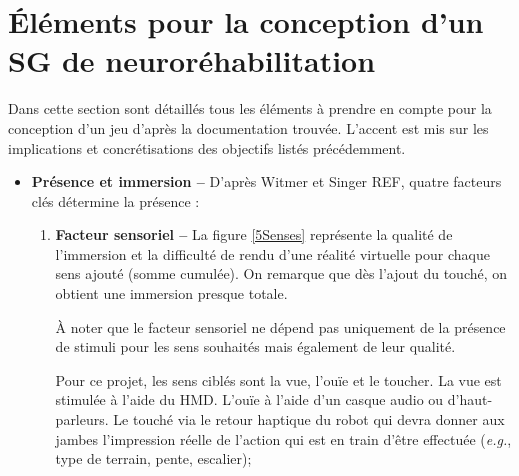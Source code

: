 \section{Éléments pour la conception d'un SG de neuroréhabilitation}
	\label{sAnaGameConceptPointsImportant}
	Dans cette section sont détaillés tous les éléments à prendre en compte pour la conception d'un jeu d'après la documentation trouvée. L'accent est mis sur les implications et concrétisations des objectifs listés précédemment.
	\begin{itemize}
		\item \textbf{Présence et immersion --} D'après Witmer et Singer REF, quatre facteurs clés détermine la présence \cite{Witmer_MeasuringPresence}:
		\begin{enumerate}
			\item \textbf{Facteur sensoriel --} La figure \ref{5Senses} représente la qualité de l'immersion et la difficulté de rendu d'une réalité virtuelle pour chaque sens ajouté (somme cumulée). On remarque que dès l'ajout du touché, on obtient une immersion presque totale.
			
			\begin{minipage}{\linewidth}
				\label{5Senses}
			\end{minipage}\medskip
			
			À noter que le facteur sensoriel ne dépend pas uniquement de la présence de stimuli pour les sens souhaités mais également de leur qualité.
			
			Pour ce projet, les sens ciblés sont la vue, l'ouïe et le toucher. La vue est stimulée à l'aide du HMD. L'ouïe à l'aide d'un casque audio ou d'haut-parleurs. Le touché via le retour haptique du robot qui devra donner aux jambes l'impression réelle de l'action qui est en train d'être effectuée (\textit{e.g.}, type de terrain, pente, escalier);
			

\end{enumerate}
\end{itemize}
